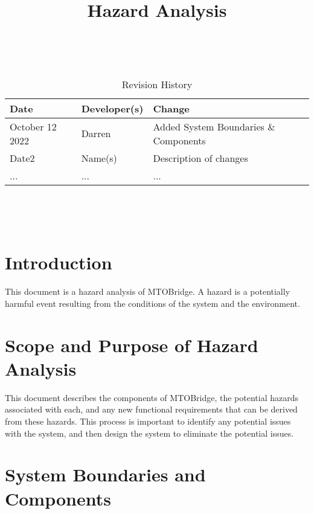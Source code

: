 \documentclass{article}
\title{Hazard Analysis\\\progname}
\author{\authname}
\date{}
\begin{document}
\maketitle
\thispagestyle{empty}

~\newpage


\begin{table}[hp]
\caption{Revision History} \label{TblRevisionHistory}
\begin{tabularx}{\textwidth}{llX}
\toprule
\textbf{Date} & \textbf{Developer(s)} & \textbf{Change}\\
\midrule
October 12 2022 & Darren & Added System Boundaries \& Components\\
Date2 & Name(s) & Description of changes\\
... & ... & ...\\
\bottomrule
\end{tabularx}
\end{table}

~\newpage

\tableofcontents

~\newpage



\section{Introduction}

This document is a hazard analysis of MTOBridge. A hazard is a potentially harmful event resulting
from the conditions of the system and the environment.

\section{Scope and Purpose of Hazard Analysis}

This document describes the components of MTOBridge, the potential hazards associated with each, and 
any new functional requirements that can be derived from these hazards. This process is important to 
identify any potential issues with the system, and then design the system to eliminate the potential issues.

\section{System Boundaries and Components}
\end{document}
